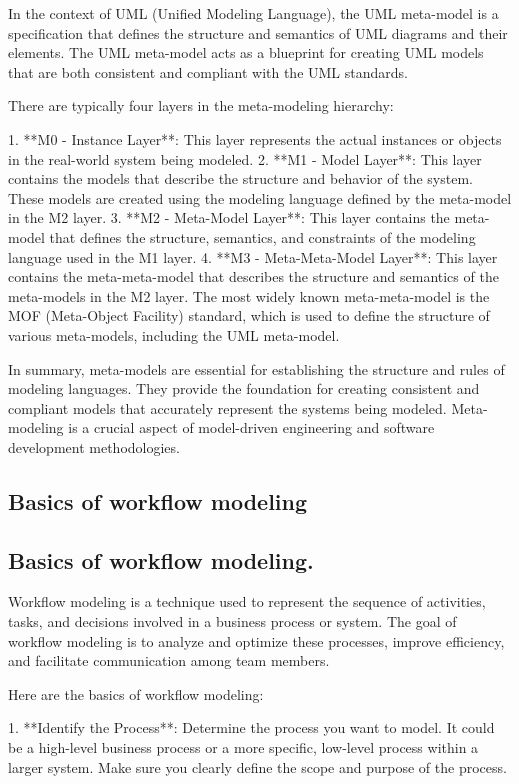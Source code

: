 \documentclass{article}
\begin{document}
In the context of UML (Unified Modeling Language), the UML meta-model is a specification that defines the structure and semantics of UML diagrams and their elements. The UML meta-model acts as a blueprint for creating UML models that are both consistent and compliant with the UML standards.

There are typically four layers in the meta-modeling hierarchy:

1. **M0 - Instance Layer**: This layer represents the actual instances or objects in the real-world system being modeled.
2. **M1 - Model Layer**: This layer contains the models that describe the structure and behavior of the system. These models are created using the modeling language defined by the meta-model in the M2 layer.
3. **M2 - Meta-Model Layer**: This layer contains the meta-model that defines the structure, semantics, and constraints of the modeling language used in the M1 layer.
4. **M3 - Meta-Meta-Model Layer**: This layer contains the meta-meta-model that describes the structure and semantics of the meta-models in the M2 layer. The most widely known meta-meta-model is the MOF (Meta-Object Facility) standard, which is used to define the structure of various meta-models, including the UML meta-model.

In summary, meta-models are essential for establishing the structure and rules of modeling languages. They provide the foundation for creating consistent and compliant models that accurately represent the systems being modeled. Meta-modeling is a crucial aspect of model-driven engineering and software development methodologies.


\subsection{Basics of workflow modeling}
\subsection{Basics of workflow modeling.}

Workflow modeling is a technique used to represent the sequence of activities, tasks, and decisions involved in a business process or system. The goal of workflow modeling is to analyze and optimize these processes, improve efficiency, and facilitate communication among team members.

Here are the basics of workflow modeling:

1. **Identify the Process**: Determine the process you want to model. It could be a high-level business process or a more specific, low-level process within a larger system. Make sure you clearly define the scope and purpose of the process.
\end{document}
